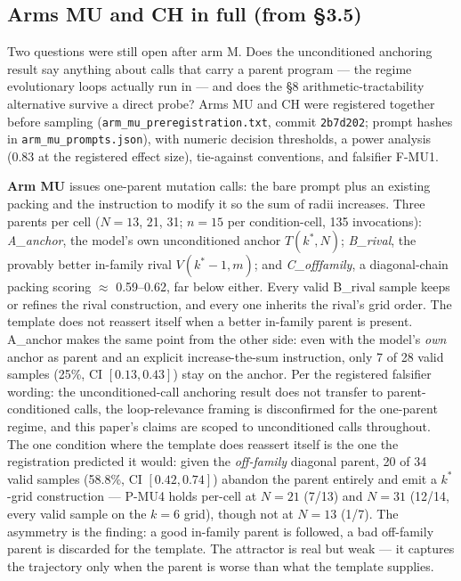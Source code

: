 \subsection{Arms MU and CH in full (from \S3.5)}

Two questions were still open after arm M. Does the unconditioned anchoring result say anything
about calls that carry a parent program --- the regime evolutionary loops actually run in --- and
does the \S8 arithmetic-tractability alternative survive a direct probe? Arms MU and CH were
registered together before sampling (\texttt{arm\_mu\_preregistration.txt}, commit \texttt{2b7d202};
prompt hashes in \texttt{arm\_mu\_prompts.json}), with numeric decision thresholds, a power analysis
(0.83 at the registered effect size), tie-against conventions, and falsifier F-MU1.

\textbf{Arm MU} issues one-parent mutation calls: the bare prompt plus an existing packing and the
instruction to modify it so the sum of radii increases. Three parents per cell
($N = 13$, 21, 31; $n = 15$ per condition-cell, 135 invocations): \emph{A\_anchor}, the model's own
unconditioned anchor $T(k^*, N)$; \emph{B\_rival}, the provably better in-family rival $V(k^*{-}1, m)$;
and \emph{C\_offfamily}, a diagonal-chain packing scoring $\approx$ 0.59--0.62, far below either.
Every valid B\_rival sample keeps or refines the rival construction, and every one inherits the
rival's grid order. The template does not reassert itself when a better in-family parent is
present. A\_anchor makes the same point from the other side: even with the model's \emph{own} anchor
as parent and an explicit increase-the-sum instruction, only 7 of 28 valid samples (25\%,
CI $[0.13, 0.43]$) stay on the anchor. Per the registered falsifier wording: the unconditioned-call
anchoring result does not transfer to parent-conditioned calls, the loop-relevance framing is
disconfirmed for the one-parent regime, and this paper's claims are scoped to unconditioned calls
throughout. The one condition where the template does reassert itself is the one the registration
predicted it would: given the \emph{off-family} diagonal parent, 20 of 34 valid samples (58.8\%,
CI $[0.42, 0.74]$) abandon the parent entirely and emit a $k^*$-grid construction --- P-MU4 holds
per-cell at $N = 21$ (7/13) and $N = 31$ (12/14, every valid sample on the $k = 6$ grid), though
not at $N = 13$ (1/7). The asymmetry is the finding: a good in-family parent is followed, a bad
off-family parent is discarded for the template. The attractor is real but weak --- it captures
the trajectory only when the parent is worse than what the template supplies.

